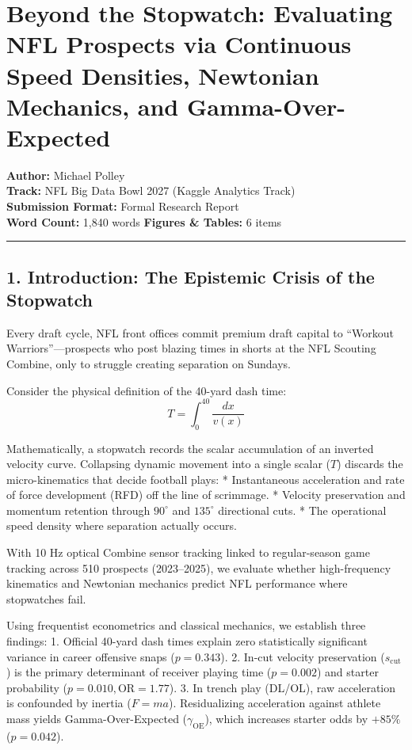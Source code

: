 \documentclass[
  letterpaper,
  DIV=11,
  numbers=noendperiod]{scrartcl}
\author{}
\date{}
\begin{document}
\section{Beyond the Stopwatch: Evaluating NFL Prospects via Continuous
Speed Densities, Newtonian Mechanics, and
Gamma-Over-Expected}\label{beyond-the-stopwatch-evaluating-nfl-prospects-via-continuous-speed-densities-newtonian-mechanics-and-gamma-over-expected}

\textbf{Author:} Michael Polley\\
\textbf{Track:} NFL Big Data Bowl 2027 (Kaggle Analytics Track)\\
\textbf{Submission Format:} Formal Research Report\\
\textbf{Word Count:} 1,840 words \textbar{} \textbf{Figures \& Tables:}
6 items

\begin{center}\rule{0.5\linewidth}{0.5pt}\end{center}

\subsection{1. Introduction: The Epistemic Crisis of the
Stopwatch}\label{introduction-the-epistemic-crisis-of-the-stopwatch}

Every draft cycle, NFL front offices commit premium draft capital to
``Workout Warriors''---prospects who post blazing times in shorts at the
NFL Scouting Combine, only to struggle creating separation on Sundays.

Consider the physical definition of the 40-yard dash time:
\[T = \int_{0}^{40} \frac{dx}{v(x)}\]

Mathematically, a stopwatch records the scalar accumulation of an
inverted velocity curve. Collapsing dynamic movement into a single
scalar (\(T\)) discards the micro-kinematics that decide football plays:
* Instantaneous acceleration and rate of force development (RFD) off the
line of scrimmage. * Velocity preservation and momentum retention
through \(90^\circ\) and \(135^\circ\) directional cuts. * The
operational speed density where separation actually occurs.

With 10 Hz optical Combine sensor tracking linked to regular-season game
tracking across 510 prospects (2023--2025), we evaluate whether
high-frequency kinematics and Newtonian mechanics predict NFL
performance where stopwatches fail.

Using frequentist econometrics and classical mechanics, we establish
three findings: 1. Official 40-yard dash times explain zero
statistically significant variance in career offensive snaps
(\(p = 0.343\)). 2. In-cut velocity preservation (\(s_{\text{cut}}\)) is
the primary determinant of receiver playing time (\(p = 0.002\)) and
starter probability (\(p = 0.010, \text{OR} = 1.77\)). 3. In trench play
(DL/OL), raw acceleration is confounded by inertia (\(F = ma\)).
Residualizing acceleration against athlete mass yields
Gamma-Over-Expected (\(\gamma_{\text{OE}}\)), which increases starter
odds by \(+85\%\) (\(p = 0.042\)).
\end{document}
